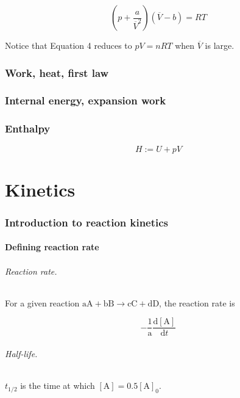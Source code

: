 \documentclass{article}
\numberwithin{theorem}{section}
\numberwithin{corollary}{section}
\numberwithin{postulate}{section}
\numberwithin{lemma}{section}
\numberwithin{definition}{section}
\begin{document}
\begin{equation}
  \left( p + \frac{a}{\overline{V}^2} \right) (\overline{V} - b) = RT 
\end{equation}

Notice that Equation 4 reduces to $pV = nRT$ when $\overline{V}$ is large.

\section{Work, heat, first law}

\section{Internal energy, expansion work}

\section{Enthalpy}

\begin{equation}
  H := U + pV
\end{equation}


\part{Kinetics}

\section{Introduction to reaction kinetics}

\subsection{Defining reaction rate}

\paragraph{Reaction rate.} For a given reaction $\mathrm{aA} + \mathrm{bB}
\rightarrow \mathrm{cC} + \mathrm{dD}$, the reaction rate is

\begin{equation}
  -\frac{1}{\mathrm{a}} \frac{\mathrm{d[A]}}{\mathrm{d}t} 
\end{equation}

\paragraph{Half-life.} $t_{1/2}$ is the time at which $[\mathrm{A}] =
0.5[\mathrm{A}]_0$.
\end{document}
